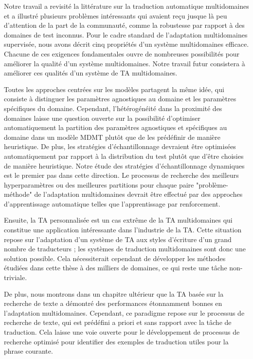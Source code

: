 Notre travail a revisité la littérature sur la traduction automatique multidomaines et a illustré plusieurs problèmes intéressants qui avaient reçu jusque là peu d'attention de la part de la communauté, comme la robustesse par rapport à des domaines de test inconnus. Pour le cadre standard de l'adaptation multidomaines supervisée, nous avons décrit cinq propriétés d'un système multidomaines efficace. Chacune de ces exigences fondamentales ouvre de nombreuses possibilités pour améliorer la qualité d'un système multidomaines. Notre travail futur consistera à améliorer ces qualités d'un système de TA multidomaines.

Toutes les approches centrées sur les modèles partagent la même idée, qui consiste à distinguer les paramètres agnostiques au domaine et les paramètres spécifiques du domaine. Cependant, l'hétérogénéité dans la proximité des domaines laisse une question ouverte sur la possibilité d'optimiser automatiquement la partition des paramètres agnostiques et spécifiques au domaine dans un modèle MDMT plutôt que de les prédéfinir de manière heuristique. De plus, les stratégies d'échantillonnage devraient être optimisées automatiquement par rapport à la distribution du test plutôt que d'être choisies de manière heuristique. Notre étude des stratégies d'échantillonnage dynamiques est le premier pas dans cette direction. Le processus de recherche des meilleurs hyperparamètres ou des meilleures partitions pour chaque paire "problème-méthode" de l'adaptation multidomaines devrait être effectué par des approches d'apprentissage automatique telles que l'apprentissage par renforcement.

Ensuite, la TA personnalisée est un cas extrême de la TA multidomaines \citep{Michel18extreme} qui constitue une application intéressante dans l'industrie de la TA. Cette situation repose sur l'adaptation d'un système de TA aux styles d'écriture d'un grand nombre de traducteurs ; les systèmes de traduction multidomaines sont donc une solution possible. Cela nécessiterait cependant de développer les méthodes étudiées dans cette thèse à des milliers de domaines, ce qui reste une tâche non-triviale.

De plus, nous montrons dans un chapitre ultérieur que la TA basée sur la recherche de texte a démontré des performances étonnamment bonnes en l'adaptation multidomaines. Cependant, ce paradigme repose sur le processus de recherche de texte, qui est prédéfini a priori et sans rapport avec la tâche de traduction. Cela laisse une voie ouverte pour le développement de processus de recherche optimisé pour identifier des exemples de traduction utiles pour la phrase courante.

